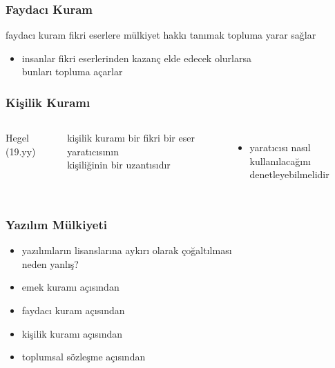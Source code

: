 \documentclass[dvipsnames]{beamer}
\theoremstyle{plain}
\begin{document}
\begin{frame}
  \frametitle{Faydacı Kuram}

  \begin{block}{faydacı kuram}
    fikri eserlere mülkiyet hakkı tanımak topluma yarar sağlar
  \end{block}

  \begin{itemize}
    \item insanlar fikri eserlerinden kazanç elde edecek olurlarsa\\
      bunları topluma açarlar
  \end{itemize}
\end{frame}

\begin{frame}
  \frametitle{Kişilik Kuramı}

  \begin{columns}
    \begin{center}

      Hegel (19.yy)
    \end{center}

    \begin{block}{kişilik kuramı}
      bir fikri bir eser yaratıcısının\\
      kişiliğinin bir uzantısıdır
    \end{block}

    \begin{itemize}
      \item yaratıcısı nasıl kullanılacağını\\
        denetleyebilmelidir
    \end{itemize}
  \end{columns}
\end{frame}

\begin{frame}
  \frametitle{Yazılım Mülkiyeti}

  \begin{itemize}
    \item yazılımların lisanslarına aykırı olarak çoğaltılması\\
      neden yanlış?

    \pause
    \medskip
    \item emek kuramı açısından

    \pause
    \item faydacı kuram açısından

    \pause
    \item kişilik kuramı açısından

    \pause
    \item toplumsal sözleşme açısından
  \end{itemize}
\end{frame}
\end{document}
